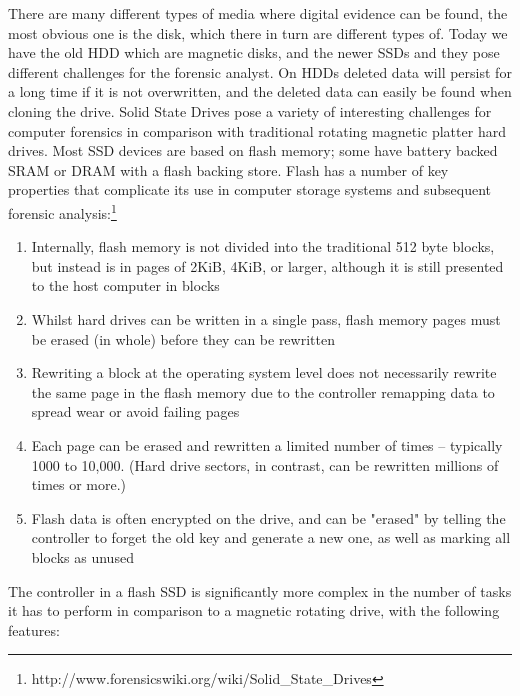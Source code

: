 There are many different types of media where digital evidence can be found, the
most obvious one is the disk, which there in turn are different types of. Today
we have the old HDD which are magnetic disks, and the newer SSDs and they pose
different challenges for the forensic analyst. On HDDs deleted data will persist
for a long time  if it is not overwritten, and the deleted data can easily be 
found when cloning the drive. Solid State Drives pose a variety of interesting 
challenges for computer forensics in comparison with traditional rotating 
magnetic platter hard drives. Most SSD devices are based on flash memory; some 
have battery backed SRAM or DRAM with a flash backing store. Flash has a number 
of key properties that complicate its use in computer storage systems and 
subsequent forensic analysis:\footnote{http://www.forensicswiki.org/wiki/Solid\_State\_Drives}
\begin{enumerate}
    \item Internally, flash memory is not divided into the traditional 512 byte 
        blocks, but instead is in pages of 2KiB, 4KiB, or larger, although it is
        still presented to the host computer in blocks

    \item Whilst hard drives can be written in a single pass, flash memory pages
        must be erased (in whole) before they can be rewritten

    \item Rewriting a block at the operating system level does not necessarily 
        rewrite the same page in the flash memory due to the controller 
        remapping data to spread wear or avoid failing pages

    \item Each page can be erased and rewritten a limited number of times – 
        typically 1000 to 10,000. (Hard drive sectors, in contrast, can be 
        rewritten millions of times or more.)

    \item Flash data is often encrypted on the drive, and can be "erased" by
        telling the controller to forget the old key and generate a new one, as
        well as marking all blocks as unused
\end{enumerate}

The controller in a flash SSD is significantly more complex in the number of 
tasks it has to perform in comparison to a magnetic rotating drive, with the 
following features:

